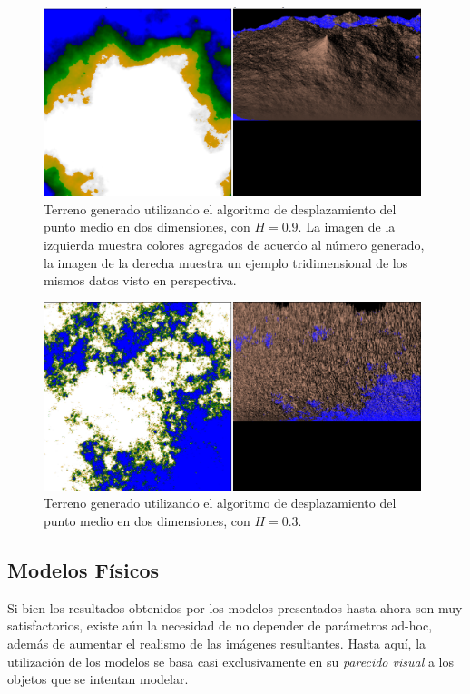 \begin{figure}
\center
\includegraphics[width=11cm]{figures/terreno}
\caption[Terreno generado utilizando el algoritmo de desplazamiento del punto medio en dos dimensiones, con $H = 0.9$]{Terreno generado utilizando el algoritmo de desplazamiento del punto medio en dos dimensiones, con $H = 0.9$. La imagen de la izquierda muestra colores agregados de acuerdo al número generado, la imagen de la derecha muestra un ejemplo tridimensional de los mismos datos visto en perspectiva.}
\label{fg:terreno}
\end{figure}

\begin{figure}
\center
\includegraphics[width=11cm]{figures/terreno2}
\caption[Terreno generado utilizando el algoritmo de desplazamiento del punto medio en dos dimensiones, con $H = 0.3$]{Terreno generado utilizando el algoritmo de desplazamiento del punto medio en dos dimensiones, con $H = 0.3$.}
\label{fg:terreno2}
\end{figure}



\subsection{Modelos Físicos}
Si bien los resultados obtenidos por los modelos presentados hasta ahora son muy satisfactorios, existe aún la necesidad de no depender de parámetros ad-hoc, además de aumentar el realismo de las imágenes resultantes.
Hasta aquí, la utilización de los modelos se basa casi exclusivamente en su {\em parecido visual} a los objetos que se intentan modelar.

